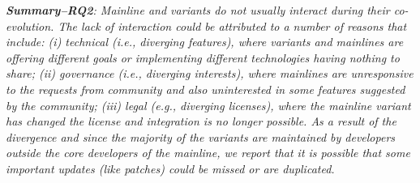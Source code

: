 \begin{framed}
\noindent
\emph{\textbf{Summary--RQ2}: Mainline and variants do not usually interact during their co-evolution. The lack of interaction could be attributed to a number of reasons that include: (i) technical (i.e., diverging features), where variants and mainlines are offering different goals or implementing different technologies having nothing to share; (ii) governance (i.e., diverging interests), where mainlines are unresponsive to the requests from community and also uninterested in some features suggested by the community; (iii) legal (e.g., diverging licenses), where the mainline variant has changed the license and integration is no longer possible. As a result of the divergence and since the majority of the variants are maintained by developers outside the core developers of the mainline, we report that it is possible that some important updates (like patches) could be missed or are duplicated.
}
\end{framed}
